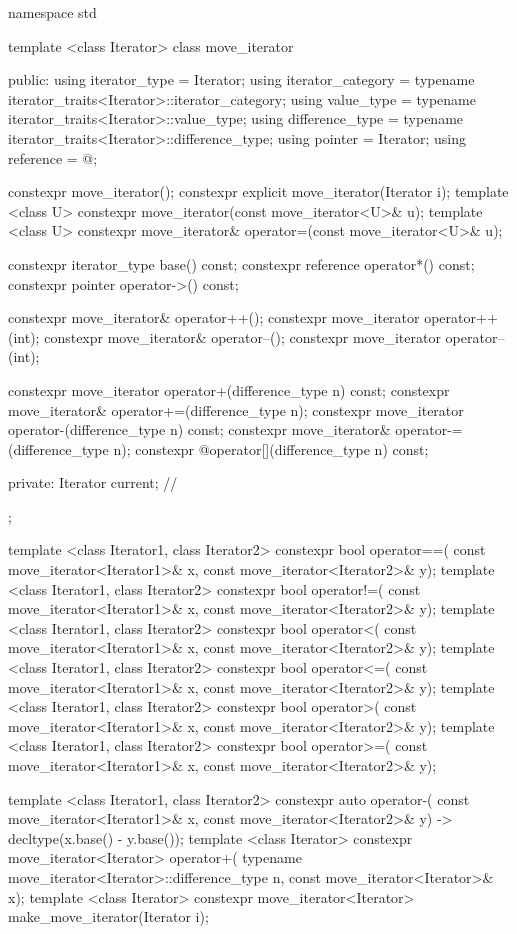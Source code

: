 %
\begin{codeblock}
namespace std {
  template <class Iterator>
  class move_iterator {
  public:
    using iterator_type     = Iterator;
    using iterator_category = typename iterator_traits<Iterator>::iterator_category;
    using value_type        = typename iterator_traits<Iterator>::value_type;
    using difference_type   = typename iterator_traits<Iterator>::difference_type;
    using pointer           = Iterator;
    using reference         = @\seebelow@;

    constexpr move_iterator();
    constexpr explicit move_iterator(Iterator i);
    template <class U> constexpr move_iterator(const move_iterator<U>& u);
    template <class U> constexpr move_iterator& operator=(const move_iterator<U>& u);

    constexpr iterator_type base() const;
    constexpr reference operator*() const;
    constexpr pointer operator->() const;

    constexpr move_iterator& operator++();
    constexpr move_iterator operator++(int);
    constexpr move_iterator& operator--();
    constexpr move_iterator operator--(int);

    constexpr move_iterator operator+(difference_type n) const;
    constexpr move_iterator& operator+=(difference_type n);
    constexpr move_iterator operator-(difference_type n) const;
    constexpr move_iterator& operator-=(difference_type n);
    constexpr @\unspec@ operator[](difference_type n) const;

  private:
    Iterator current;   // \expos
  };

  template <class Iterator1, class Iterator2>
    constexpr bool operator==(
      const move_iterator<Iterator1>& x, const move_iterator<Iterator2>& y);
  template <class Iterator1, class Iterator2>
    constexpr bool operator!=(
      const move_iterator<Iterator1>& x, const move_iterator<Iterator2>& y);
  template <class Iterator1, class Iterator2>
    constexpr bool operator<(
      const move_iterator<Iterator1>& x, const move_iterator<Iterator2>& y);
  template <class Iterator1, class Iterator2>
    constexpr bool operator<=(
      const move_iterator<Iterator1>& x, const move_iterator<Iterator2>& y);
  template <class Iterator1, class Iterator2>
    constexpr bool operator>(
      const move_iterator<Iterator1>& x, const move_iterator<Iterator2>& y);
  template <class Iterator1, class Iterator2>
    constexpr bool operator>=(
      const move_iterator<Iterator1>& x, const move_iterator<Iterator2>& y);

  template <class Iterator1, class Iterator2>
    constexpr auto operator-(
      const move_iterator<Iterator1>& x,
      const move_iterator<Iterator2>& y) -> decltype(x.base() - y.base());
  template <class Iterator>
    constexpr move_iterator<Iterator> operator+(
      typename move_iterator<Iterator>::difference_type n, const move_iterator<Iterator>& x);
  template <class Iterator>
    constexpr move_iterator<Iterator> make_move_iterator(Iterator i);
}
\end{codeblock}


